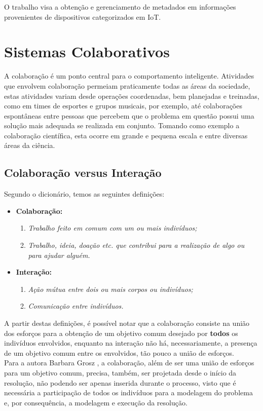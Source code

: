 O trabalho visa a obtenção e gerenciamento de metadados em informações provenientes de
dispositivos categorizados em \acrfull{IoT}. %

\section{Sistemas Colaborativos}
\qqad A colaboração é um ponto central para o comportamento inteligente.
Atividades que envolvem colaboração permeiam praticamente todas as áreas da sociedade, estas atividades variam desde operações coordenadas,
bem planejadas e treinadas, como em times de esportes e grupos musicais, por exemplo, até colaborações espontâneas
entre pessoas que percebem que o problema em questão possui uma solução mais adequada se realizada em conjunto.
Tomando como exemplo a colaboração científica, esta ocorre em grande e pequena escala e entre diversas áreas da ciência.
 \cite{cbarbara}
\subsection{Colaboração versus Interação}
Segundo o dicionário, temos as seguintes definições:
\begin{itemize}
  \item \textbf{Colaboração:}
  \begin{enumerate}
    \item \textit{Trabalho feito em comum com um ou mais indivíduos;}
    \item \textit{Trabalho, ideia, doação etc. que contribui para a realização de algo ou para ajudar alguém.}
  \end{enumerate}
  \item \textbf{Interação:}
  \begin{enumerate}
    \item \textit{Ação mútua entre dois ou mais corpos ou indivíduos;}
    \item \textit{Comunicação entre indivíduos.}
  \end{enumerate}
\end{itemize}
 \null
\quad A partir destas definições, é possível notar que a colaboração consiste na união dos esforços
para a obtenção de um objetivo comum desejado por \textbf{todos} os indivíduos envolvidos, enquanto na interação
não há, necessariamente, a presença de um objetivo comum entre os envolvidos, tão pouco a união de esforços. \\ \null \quad
Para a autora Barbara Grosz \cite{cbarbara}, a colaboração, além de ser uma união de esforços para um objetivo comum,
precisa, também, ser projetada desde o início da resolução, não podendo ser apenas inserida durante o processo, visto que é
necessária a participação de todos os indivíduos para a modelagem do problema e, por consequência, a modelagem e execução da resolução.

